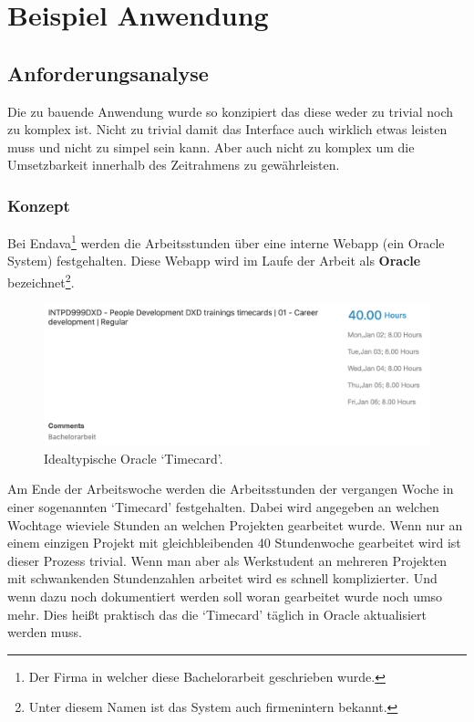 \documentclass[oneside,bibliography=totocnumbered,BCOR=5mm]{scrbook}
\begin{document}
\chapter{Beispiel Anwendung}
\label{sec:beispiel-anwendung}

\section{Anforderungsanalyse}

Die zu bauende Anwendung wurde so konzipiert das diese weder zu trivial noch
zu komplex ist. Nicht zu trivial damit das Interface auch wirklich etwas
leisten muss und nicht zu simpel sein kann. Aber auch nicht zu komplex um die
Umsetzbarkeit innerhalb des Zeitrahmens zu gewährleisten.

\subsection{Konzept}

Bei Endava\footnote{Der Firma in welcher diese Bachelorarbeit geschrieben
wurde.} werden die Arbeitsstunden über eine interne Webapp (ein Oracle System)
festgehalten. Diese Webapp wird im Laufe der Arbeit als \textbf{Oracle}
bezeichnet\footnote{Unter diesem Namen ist das System auch firmenintern
bekannt.}.

\begin{figure}[H]
  \centering
  \includegraphics[scale=0.25]{oracle-ideal.png}
  \caption{Idealtypische Oracle `Timecard'.}
\end{figure}

Am Ende der Arbeitswoche werden die Arbeitsstunden der vergangen Woche in
einer sogenannten `Timecard' festgehalten. Dabei wird angegeben an welchen
Wochtage wieviele Stunden an welchen Projekten gearbeitet wurde. Wenn nur an
einem einzigen Projekt mit gleichbleibenden 40 Stundenwoche gearbeitet wird ist
dieser Prozess trivial. Wenn man aber als Werkstudent an mehreren Projekten mit
schwankenden Stundenzahlen arbeitet wird es schnell komplizierter. Und wenn dazu
noch dokumentiert werden soll woran gearbeitet wurde noch umso mehr. Dies heißt
praktisch das die ‘Timecard’ täglich in Oracle aktualisiert werden muss.
\end{document}
